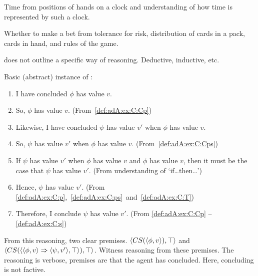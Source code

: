 \begin{note}[\illu{1}]
  Time from positions of hands on a clock and understanding of how time is represented by such a clock.

  Whether to make a bet from tolerance for risk, distribution of cards in a pack, cards in hand, and rules of the game.
\end{note}

\begin{note}
  \adA{} does not outline a specific way of reasoning.
  Deductive, inductive, etc.\
\end{note}

\begin{note}
  Basic (abstract) instance of \adA{}:

  {
    \small
    \begin{enumerate}[label=\arabic*., ref=\arabic*]
    \item\label{def:adA:ex:C:Cp} I have concluded \(\phi\) has value \(v\).
    \item\label{def:adA:ex:C:p} So, \(\phi\) has value \(v\). \hfill(From~\ref{def:adA:ex:C:Cp})
    \item\label{def:adA:ex:C:Cps} Likewise, I have concluded \(\psi\) has value \(v'\) when \(\phi\) has value \(v\).
    \item\label{def:adA:ex:C:ps} So, \(\psi\) has value \(v'\) when \(\phi\) has value \(v\). \hfill(From~\ref{def:adA:ex:C:Cps})
    \item\label{def:adA:ex:C:T} If \(\psi\) has value \(v'\) when \(\phi\) has value \(v\) and \(\phi\) has value \(v\), then it must be the case that \(\psi\) has value \(v'\). \hfill (From understanding of `if\dots then\dots')
    \item\label{def:adA:ex:C:s} Hence, \(\psi\) has value \(v'\).\newline
      \mbox{}\hfill (From \ref{def:adA:ex:C:p},~\ref{def:adA:ex:C:ps}~and~\ref{def:adA:ex:C:T})
    \item Therefore, I conclude \(\psi\) has value \(v'\). \hfill (From \ref{def:adA:ex:C:Cp} -- \ref{def:adA:ex:C:s})
    \end{enumerate}
  }
  From this reasoning, two clear premises.
  \(\langle CS(\langle \phi, v \rangle), \top \rangle\) and \(\langle CS(\langle \langle \phi, v \rangle \Rightarrow \langle \psi, v' \rangle, \top \rangle), \top \rangle\).
  Witness reasoning from these premises.
  The reasoning is verbose, premises are that the agent has concluded.
  Here, concluding is not factive.


\end{note}
